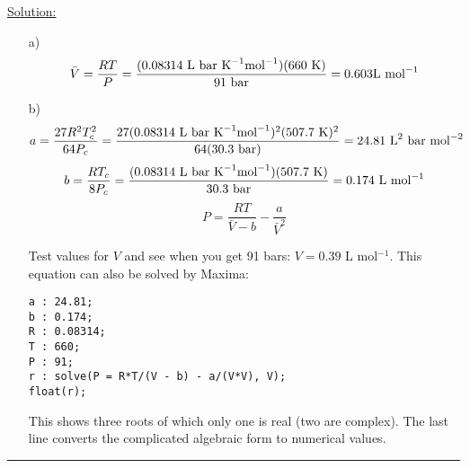 \noindent
\underline{Solution:}\\

\begin{itemize}

\item[a)] $$\bar{V} = \frac{RT}{P} = \frac{(0.08314\textnormal{ L bar K}^{-1}\textnormal{mol}^{-1})(660\textnormal{ K})}{91\textnormal{ bar}} = 0.603\textnormal{L mol}^{-1}$$

\item[b)] $$a = \frac{27R^2T_c^2}{64P_c} = \frac{27(0.08314\textnormal{ L bar K}^{-1}\textnormal{mol}^{-1})^2(507.7\textnormal{ K})^2}{64(30.3\textnormal{ bar})} = 24.81\textnormal{ L}^2\textnormal{ bar mol}^{-2}$$
$$b = \frac{RT_c}{8P_c} = \frac{(0.08314\textnormal{ L bar K}^{-1}\textnormal{mol}^{-1})(507.7\textnormal{ K})}{30.3\textnormal{ bar}} = 0.174\textnormal{ L mol}^{-1}$$
$$P = \frac{RT}{\bar{V} - b} - \frac{a}{\bar{V}^2}$$

Test values for $V$ and see when you get 91 bars: $V = 0.39$ L mol$^{-1}$. This equation can also be solved by Maxima:

\begin{verbatim}
a : 24.81;
b : 0.174;
R : 0.08314;
T : 660;
P : 91;
r : solve(P = R*T/(V - b) - a/(V*V), V);
float(r);
\end{verbatim}

This shows three roots of which only one is real (two are complex). The last line converts the complicated algebraic form to numerical values.

\end{itemize}

\hrule\vspace{0.5cm}
